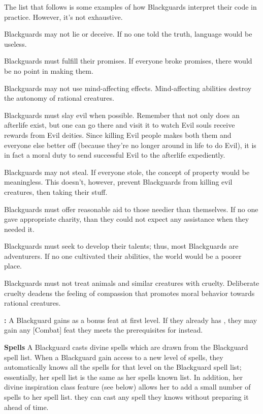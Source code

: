 The list that follows is some examples of how Blackguards interpret their code in practice. However, it's not exhaustive.
\begin{itemize*}
\item Blackguards may not lie or deceive. If no one told the truth, language would be useless.
\item Blackguards must fulfill their promises. If everyone broke promises, there would be no point in making them.
\item Blackguards may not use mind-affecting effects. Mind-affecting abilities destroy the autonomy of rational creatures.
\item Blackguards must slay evil when possible. Remember that not only does an afterlife exist, but one can go there and visit it to watch Evil souls receive rewards from Evil deities. Since killing Evil people makes both them and everyone else better off (because they're no longer around in life to do Evil), it is in fact a moral duty to send successful Evil to the afterlife expediently.
\item Blackguards may not steal. If everyone stole, the concept of property would be meaningless. This doesn't, however, prevent Blackguards from killing evil creatures, then taking their stuff.
\item Blackguards must offer reasonable aid to those needier than themselves. If no one gave appropriate charity, than they could not expect any assistance when they needed it.
\item Blackguards must seek to develop their talents; thus, most Blackguards are adventurers. If no one cultivated their abilities, the world would be a poorer place.
\item Blackguards must not treat animals and similar creatures with cruelty. Deliberate cruelty deadens the feeling of compassion that promotes moral behavior towards rational creatures.
\end{itemize*}

\textbf{:} A Blackguard gains  as a bonus feat at first level. If they already has , they may gain any [Combat] feat they meets the prerequisites for instead.

\textbf{Spells} A Blackguard casts divine spells which are drawn from the Blackguard spell list. When a Blackguard gain access to a new level of spells, they automatically knows all the spells for that level on the Blackguard spell list; essentially, her spell list is the same as her spells known list. In addition, her divine inspiration class feature (see below) allows her to add a small number of spells to her spell list. they can cast any spell they knows without preparing it ahead of time.

